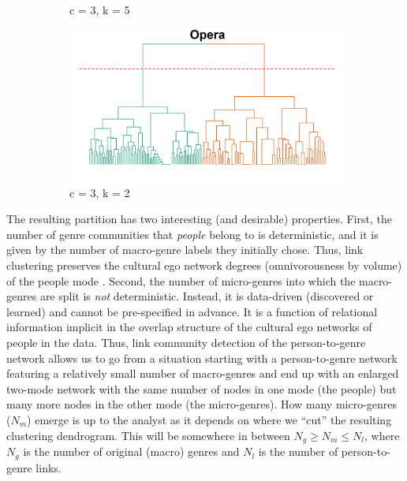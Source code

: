 \documentclass[a4paper,12pt]{extarticle}
\begin{document}
\begin{figure}[ht!]
\begin{subfigure}[b]{0.32\textwidth}
        \caption{c = 3, k = 5}
        \label{fig:dend-micro-blues}
    \end{subfigure}
     \begin{subfigure}[b]{0.32\textwidth}
        \centering
        \includegraphics[width=1.0\textwidth]{Figs/Dend/opera-branches.png}
        \caption{c = 3, k = 2}
        \label{fig:dend-micro-opera}
    \end{subfigure}
    \caption{}
    \label{fig:dend}
 \end{figure}
 
The resulting partition has two interesting (and desirable) properties. First, the number of genre communities that \textit{people} belong to is deterministic, and it is given by the number of macro-genre labels they initially chose. Thus, link clustering preserves the cultural ego network degrees (omnivorousness by volume) of the people mode \citep{lizardo14}. Second, the number of micro-genres into which the macro-genres are split is {\em not} deterministic. Instead, it is data-driven (discovered or learned) and cannot be pre-specified in advance. It is a function of relational information implicit in the overlap structure of the cultural ego networks of people in the data. Thus, link community detection of the person-to-genre network allows us to go from  a situation starting with a person-to-genre network featuring a relatively small number of macro-genres and end up with an enlarged two-mode network with the same number of nodes in one mode (the people) but many more nodes in the other mode (the micro-genres). How many micro-genres ($N_m$) emerge is up to the analyst as it depends on where we ``cut'' the resulting clustering dendrogram. This will be somewhere in between $N_g \geq N_m \leq N_l$, where $N_g$ is the number of original (macro) genres and $N_l$ is the number of person-to-genre links.
\end{document}
